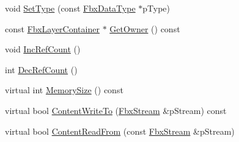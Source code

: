 \begin{DoxyCompactItemize}
void \hyperlink{class_fbx_layer_element_a017f6f6c44dd71778739b7d909c35fa8}{Set\+Type} (const \hyperlink{class_fbx_data_type}{Fbx\+Data\+Type} $\ast$p\+Type)
\item 
const \hyperlink{class_fbx_layer_container}{Fbx\+Layer\+Container} $\ast$ \hyperlink{class_fbx_layer_element_a1e83210626684c844505ffd115c27dfd}{Get\+Owner} () const
\item 
void \hyperlink{class_fbx_layer_element_a00a11912a2cca47c811c8d23bb3ede51}{Inc\+Ref\+Count} ()
\item 
int \hyperlink{class_fbx_layer_element_a80d83d36366e1cf1f79b0e1479b5a692}{Dec\+Ref\+Count} ()
\item 
virtual int \hyperlink{class_fbx_layer_element_a15654a170f2d2952bf1eafad65262b8b}{Memory\+Size} () const
\item 
virtual bool \hyperlink{class_fbx_layer_element_aa60d2178a7601f0e78a472fa7fd774aa}{Content\+Write\+To} (\hyperlink{class_fbx_stream}{Fbx\+Stream} \&p\+Stream) const
\item 
virtual bool \hyperlink{class_fbx_layer_element_a407c679ef12336f2cf916f598053bf02}{Content\+Read\+From} (const \hyperlink{class_fbx_stream}{Fbx\+Stream} \&p\+Stream)
\end{DoxyCompactItemize}

